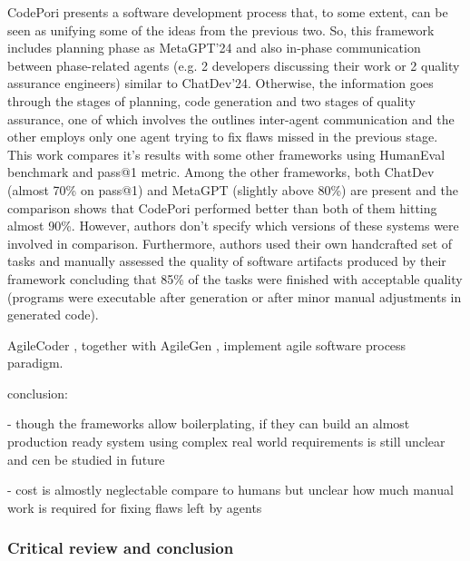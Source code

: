 CodePori \cite{rasheed2024codeporilargescaleautonomoussoftware} presents a software development process that, to some extent, can be seen as unifying some of the ideas from the previous two. So, this framework includes planning phase as MetaGPT'24 and also in-phase communication between phase-related agents (e.g. 2 developers discussing their work or 2 quality assurance engineers) similar to ChatDev'24. Otherwise, the information goes through the stages of planning, code generation and two stages of quality assurance, one of which involves the outlines inter-agent communication and the other employs only one agent trying to fix flaws missed in the previous stage. This work compares it's results with some other frameworks using HumanEval \cite{humaneval} benchmark and pass@1 metric. Among the other frameworks, both ChatDev (almost 70\% on pass@1) and MetaGPT (slightly above 80\%) are present and the comparison shows that CodePori performed better than both of them hitting almost 90\%. However, authors don't specify which versions of these systems were involved in comparison. Furthermore, authors used their own handcrafted set of tasks and manually assessed the quality of software artifacts produced by their framework concluding that 85\% of the tasks were finished with acceptable quality (programs were executable after generation or after minor manual adjustments in generated code). 

AgileCoder \cite{nguyen2024agilecoderdynamiccollaborativeagents}, together with AgileGen \cite{zhang2024empoweringagilebasedgenerativesoftware}, implement agile software process paradigm.


conclusion:

- though the frameworks allow boilerplating, if they can build an almost production ready system using complex real world requirements is still unclear and cen be studied in future

- cost is almostly neglectable compare to humans but unclear how much manual work is required for fixing flaws left by agents


\subsubsection{Critical review and conclusion}
\label{mas:conclusion}
